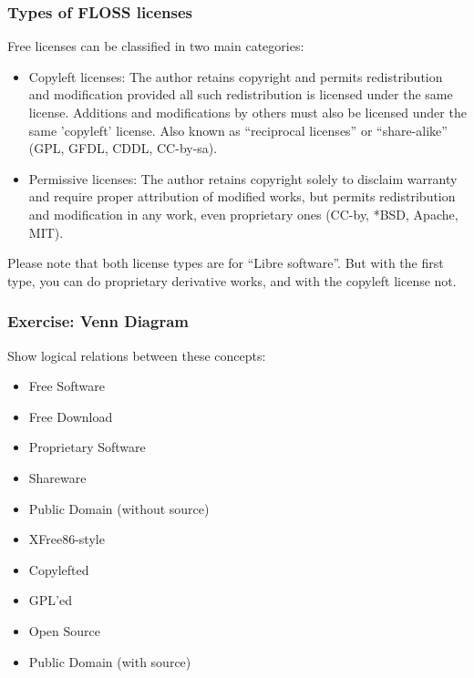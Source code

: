 \begin{frame}
\frametitle{Types of FLOSS licenses}
Free licenses can be classified in two main categories:\\\pause
\begin{itemize}
\item \alert{Copyleft licenses:} The author retains copyright and permits redistribution and modification provided all such redistribution is licensed under the same license. Additions and modifications by others must also be licensed under the same 'copyleft' license. Also known as ``reciprocal licenses'' or ``share-alike'' (GPL, GFDL, CDDL, CC-by-sa).\\\pause

\item \alert{Permissive licenses:} The author retains copyright solely to disclaim warranty and require proper attribution of modified works, but permits redistribution and modification in any work, even proprietary ones (CC-by, *BSD, Apache, MIT).\\\pause
\end{itemize}

Please note that both license types are for ``Libre software''. But with the first type, you can do proprietary derivative works, and with the copyleft license not.

\end{frame}


\begin{frame}
\frametitle{Exercise: Venn Diagram}

Show logical relations between these concepts:
\begin{itemize}
\item Free Software 
\item Free Download
\item Proprietary Software
\item Shareware 
\item Public Domain (without source)
\item XFree86-style
\item Copylefted
\item GPL'ed
\item Open Source
\item Public Domain (with source)
\end{itemize}

\end{frame}


